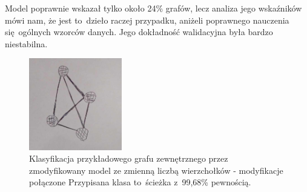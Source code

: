 Model poprawnie wskazał tylko około 24\% grafów, lecz analiza jego wskaźników mówi nam,
że jest to~dzieło raczej przypadku, aniżeli poprawnego nauczenia się~ogólnych wzorców danych.
Jego dokładność walidacyjna była bardzo niestabilna.

\begin{figure}[ht]
	\centering
	\includegraphics[height=4cm]{../graph_classification/test_graphs/drawn/full-3.png}
	\caption{Klasyfikacja przykładowego grafu zewnętrznego przez zmodyfikowany model ze zmienną liczbą wierzchołków - modyfikacje połączone
		Przypisana klasa to~ścieżka z~99,68\% pewnością.}
	\label{Fig:tests-cv-2d}
\end{figure}
\FloatBarrier